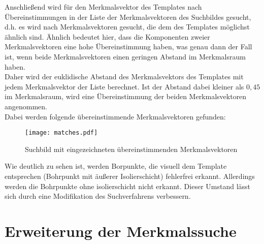 Anschließend wird für den Merkmalsvektor des Templates nach Übereinstimmungen in der Liste der Merkmalsvektoren des Suchbildes gesucht, d.h. es wird nach Merkmalsvektoren gesucht, die dem des Templates möglichst ähnlich sind. Ähnlich bedeutet hier, dass die Komponenten zweier Merkmalsvektoren eine hohe Übereinstimmung haben, was genau dann der Fall ist, wenn beide Merkmalsvektoren einen geringen Abstand im Merkmalsraum haben. \\
Daher wird der euklidische Abstand des Merkmalsvektors des Templates mit jedem Merkmalsvektor der Liste berechnet. Ist der Abstand dabei kleiner als $0,45$ im Merkmalsraum, wird eine Übereinstimmung der beiden Merkmalsvektoren angenommen.\\
Dabei werden folgende übereinstimmende Merkmalsvektoren gefunden:
\begin{figure}[H]
  \begin{center}
    \texttt{[image: matches.pdf]}
    \caption{Suchbild mit eingezeichneten übereinstimmenden Merkmalsvektoren}
    \label{fig:suchbild_merkmal_matches}
  \end{center}
\end{figure}

Wie deutlich zu sehen ist, werden Borpunkte, die visuell dem Template entsprechen (Bohrpunkt mit äußerer Isolierschicht) fehlerfrei erkannt. Allerdings werden die Bohrpunkte ohne isolierschicht nicht erkannt. Dieser Umstand lässt sich durch eine Modifikation des Suchverfahrens verbessern.

\section{Erweiterung der Merkmalssuche}

